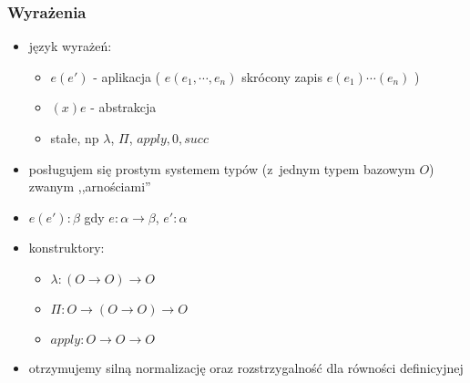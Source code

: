 \documentclass{beamer}
\begin{document}

\begin{frame}
\frametitle{Wyrażenia}

\begin{itemize}
\item język wyrażeń:
\begin{itemize}
\item $e(e')$ - aplikacja ( $e(e_1, \cdots, e_n)$ skrócony zapis $e(e_1)\cdots(e_n)$ )
\item $(x)e$ - abstrakcja
\item stałe, np $\lambda$, $\Pi$, $apply, 0, succ$
\end{itemize}

\end{itemize}


\begin{itemize}
\item posługujem się prostym systemem typów (z~jednym typem bazowym $O$) zwanym ,,arnościami''
\item $e(e') : \beta$ gdy $e : \alpha \to \beta$, $e' : \alpha$
\item konstruktory:
\begin{itemize}
\item $\lambda : (O \to O) \to O$
\item $\Pi: O \to (O \to O) \to O$
\item $apply : O\to O \to O$
\end{itemize}

\item otrzymujemy silną normalizację oraz rozstrzygalność dla równości definicyjnej
\end{itemize}


\end{frame}

\end{document}
